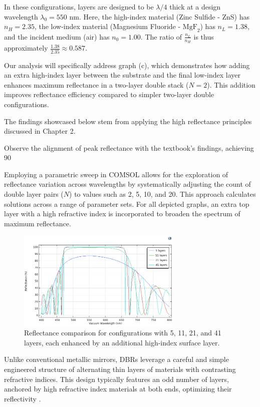 In these configurations, layers are designed to be $\lambda/4$ thick at a design wavelength $\lambda_0 = 550$ nm. Here, the high-index material (Zinc Sulfide - ZnS) has $n_H = 2.35$, the low-index material (Magnesium Fluoride - $\text{MgF}_2$) has $n_L = 1.38$, and the incident medium (air) has $n_0 = 1.00$. The ratio of $\frac{n_L}{n_H}$ is thus approximately $\frac{1.38}{2.35} \approx 0.587$.

Our analysis will specifically address graph (c), which demonstrates how adding an extra high-index layer between the substrate and the final low-index layer enhances maximum reflectance in a two-layer double stack ($N = 2$). This addition improves reflectance efficiency compared to simpler two-layer double configurations.

The findings showcased below stem from applying the high reflectance principles discussed in Chapter 2.

Observe the alignment of peak reflectance with the textbook's findings, achieving 90%

Employing a parametric sweep in COMSOL allows for the exploration of reflectance variation across wavelengths by systematically adjusting the count of double layer pairs ($N$) to values such as 2, 5, 10, and 20. This approach calculates solutions across a range of parameter sets. For all depicted graphs, an extra top layer with a high refractive index is incorporated to broaden the spectrum of maximum reflectance.

\begin{figure}[H]
  \centering
  \includegraphics[width=0.7\textwidth]{Chapters/Figures/Chapter 4 Figures/High-Reflectance (5, 11, 21, and 41 Layers).png}
  \caption{Reflectance comparison for configurations with 5, 11, 21, and 41 layers, each enhanced by an additional high-index surface layer.}
  \label{fig:COMSOL multi-layer reflectance results}
\end{figure}

Unlike conventional metallic mirrors, DBRs leverage a careful and simple engineered structure of alternating thin layers of materials with contrasting refractive indices. This design typically features an odd number of layers, anchored by high refractive index materials at both ends, optimizing their reflectivity \cite{multiphysics__distributed_nodate}.

